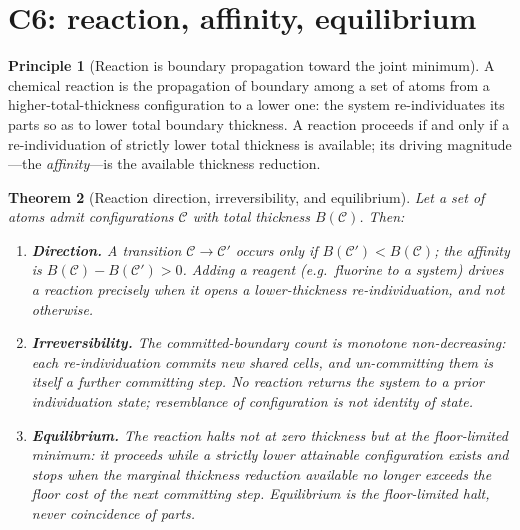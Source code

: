 \documentclass[11pt,twocolumn,a4paper]{article}
\theoremstyle{thmstyle}
\newtheorem{theorem}{Theorem}[section]
\theoremstyle{definition}
\newtheorem{principle}[theorem]{Principle}
\theoremstyle{remark}
\newcommand{\thick}{B}                 %
\begin{document}
\section{C6: reaction, affinity, equilibrium}
\label{sec:reaction}

\begin{principle}[Reaction is boundary propagation toward the joint minimum]
\label{prin:reaction}
A chemical reaction is the propagation of boundary among a set of atoms
from a higher-total-thickness configuration to a lower one: the system
re-individuates its parts so as to lower total boundary thickness. A
reaction proceeds if and only if a re-individuation of strictly lower
total thickness is available; its driving magnitude---the
\emph{affinity}---is the available thickness reduction.
\end{principle}

\begin{theorem}[Reaction direction, irreversibility, and equilibrium]
\label{thm:reaction}
Let a set of atoms admit configurations $\mathcal{C}$ with total
thickness $\thick(\mathcal{C})$. Then:
\begin{enumerate}[label=\textup{(\roman*)},leftmargin=2.2em]
\item \textbf{Direction.} A transition $\mathcal{C}\to\mathcal{C}'$
occurs only if $\thick(\mathcal{C}')<\thick(\mathcal{C})$; the affinity is
$\thick(\mathcal{C})-\thick(\mathcal{C}')>0$. Adding a reagent (e.g.\
fluorine to a system) drives a reaction precisely when it opens a
lower-thickness re-individuation, and not otherwise.
\item \textbf{Irreversibility.} The committed-boundary count is monotone
non-decreasing: each re-individuation commits new shared cells, and
un-committing them is itself a further committing step. No reaction
returns the system to a prior individuation state; resemblance of
configuration is not identity of state.
\item \textbf{Equilibrium.} The reaction halts not at zero thickness but
at the floor-limited minimum: it proceeds while a strictly lower
attainable configuration exists and stops when the marginal thickness
reduction available no longer exceeds the floor cost of the next
committing step. Equilibrium is the floor-limited halt, never coincidence
of parts.
\end{enumerate}
\end{theorem}
\end{document}
